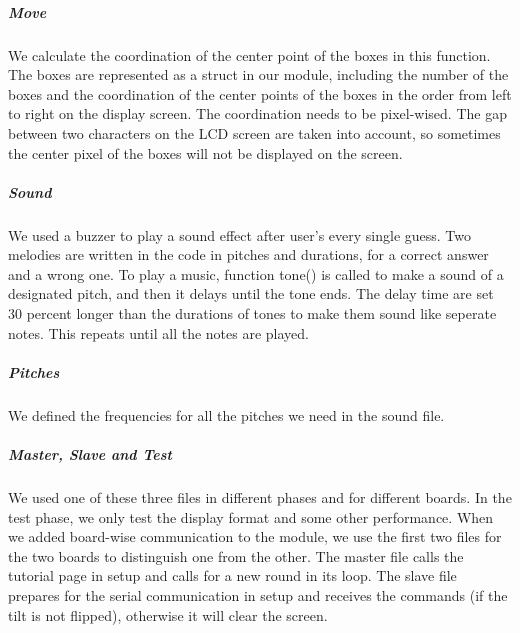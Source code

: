 \subparagraph{Move}
\hfill \newline
We calculate the coordination of the center point of the boxes in this function. The boxes are represented as a struct in our module, including the number of the boxes and the coordination of the center points of the boxes in the order from left to right on the display screen. The coordination needs to be pixel-wised. The gap between two characters on the LCD screen are taken into account, so sometimes the center pixel of the boxes will not be displayed on the screen.

\subparagraph{Sound}
\hfill \newline
We used a buzzer to play a sound effect after user's every single guess. Two melodies are written in the code in pitches and durations, for a correct answer and a wrong one. To play a music, function tone() is called to make a sound of a designated pitch, and then it delays until the tone ends. The delay time are set 30 percent longer than the durations of tones to make them sound like seperate notes. This repeats until all the notes are played.

\subparagraph{Pitches}
\hfill \newline
We defined the frequencies for all the pitches we need in the sound file.

\subparagraph{Master, Slave and Test}
\hfill \newline
We used one of these three files in different phases and for different boards. In the test phase, we only test the display format and some other performance. When we added board-wise communication to the module, we use the first two files for the two boards to distinguish one from the other. The master file calls the tutorial page in setup and calls for a new round in its loop. The slave file prepares for the serial communication in setup and receives the commands (if the tilt is not flipped), otherwise it will clear the screen.

